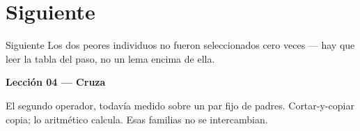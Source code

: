 \section{Siguiente}

\begin{frame}{Siguiente}
Los dos peores individuos no fueron seleccionados cero veces --- hay que leer la tabla del paso, no un lema encima de ella.

\vspace{0.8em}
\textbf{Lección 04 --- Cruza}

El segundo operador, todavía medido sobre un par fijo de padres. Cortar-y-copiar copia; lo aritmético calcula. Esas familias no se intercambian.
\end{frame}

